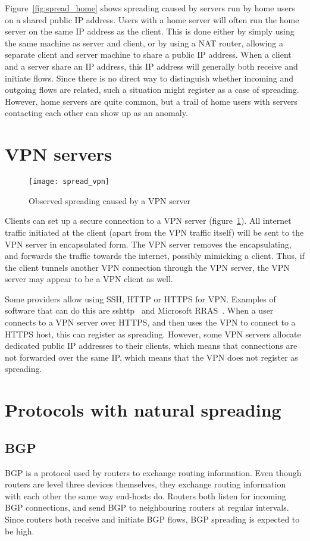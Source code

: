 Figure~\ref{fig:spread_home} shows spreading caused by servers run by home users on a shared public IP address.
Users with a home server will often run the home server on the same IP address as the client.
This is done either by simply using the same machine as server and client,
 or by using a NAT router, allowing a separate client and server machine to share a public IP address.
When a client and a server share an IP address, this IP address will generally both receive and initiate flows.
Since there is no direct way to distinguish whether incoming and outgoing flows are related,
 such a situation might register as a case of spreading.
However, home servers are quite common, but a trail of home users with servers contacting each other can show up as an anomaly.


\section{VPN servers}
\begin{figure}[h!]
	\caption{Observed spreading caused by a VPN server}
	\label{fig:spread_vpn}
	\centering
		\texttt{[image: spread\_vpn]}
\end{figure}

Clients can set up a secure connection to a VPN server (figure~\ref{fig:spread_vpn}).
All internet traffic initiated at the client (apart from the VPN traffic itself) will be sent to the VPN server in encapsulated form.
The VPN server removes the encapsulating, and forwards the traffic towards the internet, possibly mimicking a client.
Thus, if the client tunnels another VPN connection through the VPN server, the VPN server may appear to be a VPN client as well.

Some providers allow using SSH, HTTP or HTTPS for VPN.
Examples of software that can do this are sshttp~\cite{github:stealth:sshttp} and Microsoft RRAS~\cite{rras}.
When a user connects to a VPN server over HTTPS, and then uses the VPN to connect to a HTTPS host, this can register as spreading.
However, some VPN servers allocate dedicated public IP addresses to their clients,
 which means that connections are not forwarded over the same IP, which means that the VPN does not register as spreading.


\section{Protocols with natural spreading}
\label{sec:proto_spreading}
\subsection{BGP}
BGP is a protocol used by routers to exchange routing information.
Even though routers are level three devices themselves, they exchange routing information with each other the same way end-hosts do.
Routers both listen for incoming BGP connections, and send BGP to neighbouring routers at regular intervals.
Since routers both receive and initiate BGP flows, BGP spreading is expected to be high.

